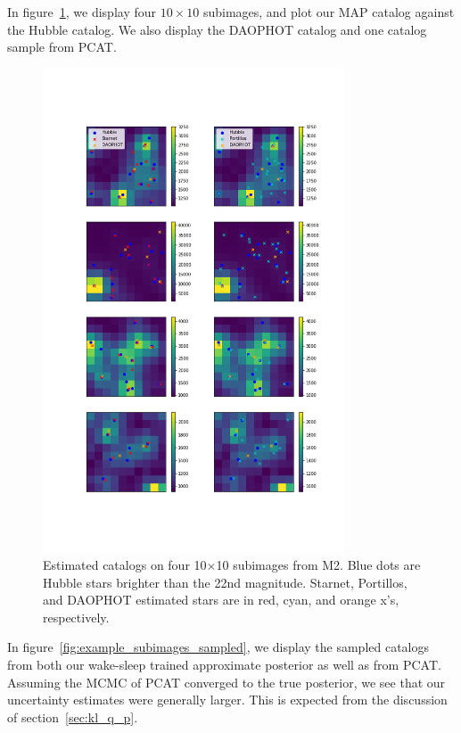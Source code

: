 In figure~\ref{fig:example_subimages}, we display four $10\times10$ subimages, and plot
our MAP catalog against the Hubble catalog. We also display the DAOPHOT catalog and one catalog sample from PCAT.

\begin{figure}[h]
    \centering
    \vspace{-3cm}
    \includegraphics[width=0.8\textwidth]{figures/example_subimages.png}
    \vspace{-3cm}
    \caption{Estimated catalogs on four 10$\times$10 subimages from
    M2. Blue dots are Hubble stars brighter than the 22nd magnitude.
    Starnet, Portillos, and DAOPHOT estimated stars are in
    red, cyan, and orange x's, respectively. }
    \label{fig:example_subimages}
\end{figure}


In figure~\ref{fig:example_subimages_sampled}, we display the sampled catalogs from both our 
wake-sleep trained approximate posterior as well as from PCAT. Assuming the MCMC
of PCAT converged to the true posterior, we see that our uncertainty estimates
were generally larger. This is expected from the discussion of section~\ref{sec:kl_q_p}. 

